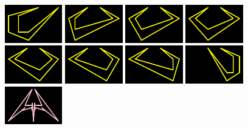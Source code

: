 \lhead[]{}
\rhead[]{}
\renewcommand{\headrulewidth}{0pt}
\vspace*{\fill}
\begin{figure}[H]
  \centering
    \includegraphics[width=2.5cm]{preface/vector_images/vec_image_curs1.png}
    \includegraphics[width=2.5cm]{preface/vector_images/vec_image_curs2.png}
    \includegraphics[width=2.5cm]{preface/vector_images/vec_image_curs3.png}
    \includegraphics[width=2.5cm]{preface/vector_images/vec_image_curs4.png}
    \includegraphics[width=2.5cm]{preface/vector_images/vec_image_curs5.png}
    \includegraphics[width=2.5cm]{preface/vector_images/vec_image_curs6.png}
    \includegraphics[width=2.5cm]{preface/vector_images/vec_image_curs7.png}
    \includegraphics[width=2.5cm]{preface/vector_images/vec_image_curs8.png}
    \includegraphics[width=2.5cm]{preface/vector_images/vec_image_ener11.png}

\end{figure}
